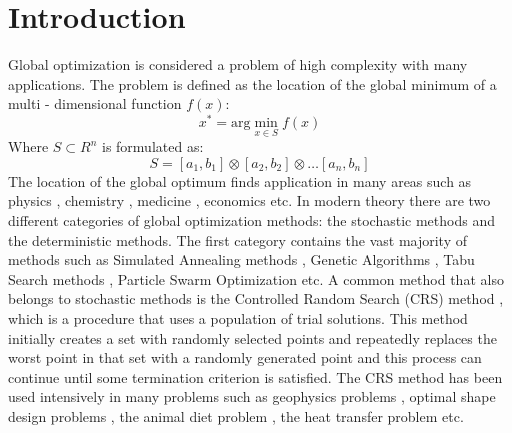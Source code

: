 \documentclass[symmetry,article,submit,moreauthors,pdftex]{Definitions/mdpi}
\begin{document}
\section{Introduction }

Global optimization\cite{GO1} is considered a problem of high complexity
with many applications. The problem is defined as the location of
the global minimum of a multi - dimensional function $f(x)$:
\begin{equation}
x^{*}=\mbox{arg}\min_{x\in S}f(x)\label{eq:eq1}
\end{equation}
Where $S\subset R^{n}$ is formulated as: 
\begin{equation}
S=\left[a_{1},b_{1}\right]\otimes\left[a_{2},b_{2}\right]\otimes\ldots\left[a_{n},b_{n}\right]\label{eq:eq2}
\end{equation}
 The location of the global optimum finds application in many  areas such as physics
\cite{physics1,physics2}, chemistry \cite{chemistry1,chemistry2},
medicine \cite{med1,med2}, economics\cite{econ1} etc. In modern
theory there are two different categories of global optimization methods:
the stochastic methods and the deterministic methods.  The first category
contains the vast majority of methods such as Simulated Annealing
methods \cite{simann_major,simann1,simann2}, Genetic Algorithms \cite{ga1,ga2,ga3},
Tabu Search methods \cite{tabu1}, Particle Swarm Optimization \cite{pso_major,pso1,pso2}
etc. A common method that also belongs to stochastic methods is the
Controlled Random Search (CRS) method \cite{crs1}, which is a procedure that uses a population of trial solutions. This method initially creates a set with randomly
selected points and repeatedly replaces the worst point in that set
with a randomly generated point and this process can continue until some termination criterion is satisfied. The CRS method has been used intensively
in many problems such as geophysics problems \cite{crs_geophysics,crs_geophysics2},
optimal shape design problems \cite{crs_optimalshape1}, the animal
diet problem \cite{crs_animaldiet1}, the heat transfer problem \cite{crs_heat1}
etc. 
\end{document}
